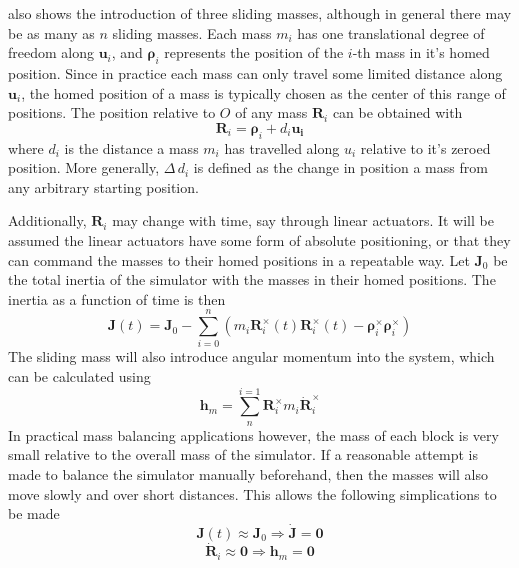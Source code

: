  also shows the introduction of three sliding masses, although in general there may be as many as $n$ sliding masses. Each mass $m_i$ has one translational degree of freedom along $\bm{u}_i$, and $\bm{\rho}_i$ represents the position of the $i$-th mass in it's homed position. Since in practice each mass can only travel some limited distance along $\bm{u}_i$, the homed position of a mass is typically chosen as the center of this range of positions. The position relative to $O$ of any mass $\bm{R}_i$ can be obtained with 
\begin{equation}\label{equation:sliding masses}
    \bm{R}_i = \bm{\rho}_i + d_i\bm{u_i}
\end{equation}
where $d_i$ is the distance a mass $m_i$ has travelled along $u_i$ relative to it's zeroed position. More generally, $\Delta\,d_i$ is defined as the change in position a mass from any arbitrary starting position.

Additionally, $\bm{R}_i$ may change with time, say through linear actuators. It will be assumed the linear actuators have some form of absolute positioning, or that they can command the masses to their homed positions in a repeatable way. Let $\bm{J}_0$ be the total inertia of the simulator with the masses in their homed positions. The inertia as a function of time is then 
\begin{equation}
    \bm{J}(t)=\bm{J}_0-\sum_{i=0}^{n}(m_i\bm{R}_i^{\times}(t)\bm{R}_i^{\times}(t)-\bm{\rho}_i^{\times}\bm  {\rho}_i^{\times})
\end{equation}
The sliding mass will also introduce angular momentum into the system, which can be calculated using 
\begin{equation}
    \bm{h}_m =\sum_{n}^{i=1}\bm{R}_i^{\times}m_i\dot{\bm{R}}_i^{\times}
\end{equation}
In practical mass balancing applications however, the mass of each block is very small relative to the overall mass of the simulator. If a reasonable attempt is made to balance the simulator manually beforehand, then the masses will also move slowly and over short distances. This allows the following simplications to be made
\begin{equation}
\bm{J}(t) \approx \bm{J}_0 \Longrightarrow \dot{\bm{J}}=\bm{0}
\end{equation}
\begin{equation}\label{equation:h_m_eq_0}
\dot{\bm{R}}_i \approx \bm{0} \Longrightarrow \bm{h}_m=\bm{0}
\end{equation}

